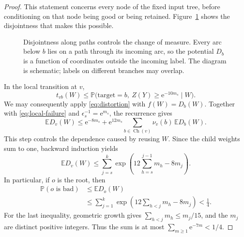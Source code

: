 \documentclass[11pt]{article}
\numberwithin{equation}{section}
\newcommand{\PP}{\mathbb P}
\newcommand{\EE}{\mathbb E}
\newcommand{\ch}{\operatorname{Ch}}
\newcommand{\ee}{\mathrm e}
\begin{document}
\begin{proof}
This statement concerns every node of the fixed input tree, before
conditioning on that node being good or being retained. Figure~\ref{fig:outside}
shows the disjointness that makes this possible.
\begin{figure}[!ht]
\centering
{}
\caption{Disjointness along paths controls the change of measure. Every
arc below $b$ lies on a path through its incoming arc, so the potential
$D_b$ is a function of coordinates outside the incoming label. The diagram
is schematic; labels on different branches may overlap.}
\label{fig:outside}
\end{figure}


In the local transition at $v$,
\[
 t_{vb}(W)\le
 \PP\bigl(\mathrm{target}=b,\ Z(Y)\ge\ee^{-10m_s}\mid W\bigr).
\]
We may consequently apply \eqref{eq:distortion} with $f(W)=D_b(W)$.
Together with \eqref{eq:local-failure} and
$\epsilon_s^{-1}=\ee^{m_s}$, the recurrence gives
\begin{equation}\label{eq:expected-potential}
 \EE D_v(W)
 \le \ee^{-8m_s}
    +\ee^{12m_s}\sum_{b\in\ch(v)}\nu_v(b)\,\EE D_b(W).
\end{equation}
This step controls the dependence caused by reusing $W$.
Since the child weights sum to one, backward induction yields
\[
 \EE D_v(W)\le
 \sum_{j=s}^k
 \exp\left(12\sum_{h=s}^{j-1}m_h-8m_j\right).
\]
In particular, if $o$ is the root, then
\begin{align*}
 \PP(o\text{ is bad})
 &\le\EE D_o(W)\\
 &\le\sum_{j=1}^k
   \exp\left(12\sum_{h<j}m_h-8m_j\right)
 <\tfrac14.
\end{align*}
For the last inequality, geometric growth gives
$\sum_{h<j}m_h\le m_j/15$, and the $m_j$ are distinct positive
integers. Thus the sum is at most
$\sum_{m\ge1}\ee^{-7m}<1/4$.


\end{proof}
\end{document}
